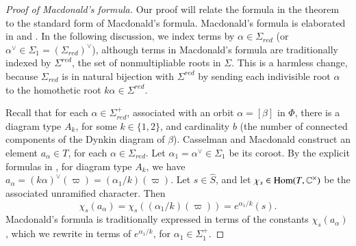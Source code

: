 \begin{proof}[Proof of Macdonald's formula]
Our proof will relate the formula in the theorem to the standard form of Macdonald's formula.
Macdonald's formula is elaborated 
in \cite{casselman1980unramified} and \cite{casselman2005companion}.
In the following discussion, we index terms by $\alpha\in\Sigma_{red}$ (or $\alpha^\vee\in \Sigma_1 = (\Sigma_{red})^\vee$), 
although terms in Macdonald's 
formula are traditionally indexed by $\Sigma^{red}$, the set of nonmultipliable roots in $\Sigma$.  
This is a harmless change, because $\Sigma_{red}$ is
in natural bijection with $\Sigma^{red}$ by sending each indivisible root $\alpha$ 
to the homothetic root $k\alpha\in\Sigma^{red}$.

Recall that for
each $\alpha\in \Sigma^+_{red}$, associated with an orbit $\alpha=[\beta]$ in $\Phi$, 
there
is a diagram type $A_k$, for some $k\in\{1,2\}$, and
cardinality $b$ (the number of connected components of the Dynkin diagram of $\beta$).
Casselman and Macdonald construct an element $a_{\alpha}\in T$, for each $\alpha\in\Sigma_{red}$.
Let $\alpha_1 = \alpha^\vee\in \Sigma_1$ be its coroot.
By the explicit formulas in \cite{casselman2005companion}, for diagram type $A_k$,
we have $a_\alpha = (k\alpha)^\vee(\varpi) = (\alpha_1/k)(\varpi)$.  
Let $s\in \hat S$, and let $\chi_s\in{\operatorname{Hom}}(T,\mathbb{C}^\times)$ be the associated
unramified character.  Then
\[
\chi_s(a_{\alpha}) = \chi_s((\alpha_1/k)(\varpi)) = e^{\alpha_1/k}(s).
\]
Macdonald's formula is traditionally expressed in terms of the constants $\chi_s(a_\alpha)$,
which we rewrite in terms of $e^{\alpha_1/k}$, for $\alpha_1\in\Sigma^+_1$.


\end{proof}
